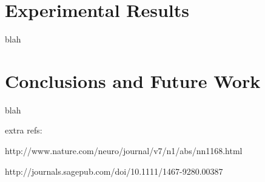 \documentclass[a4paper]{article}
\begin{document}
%

\section{Experimental Results}

blah

\section{Conclusions and Future Work}

blah

extra refs:

http://www.nature.com/neuro/journal/v7/n1/abs/nn1168.html

http://journals.sagepub.com/doi/10.1111/1467-9280.00387

%

\nocite{*} %

%

\end{document}
